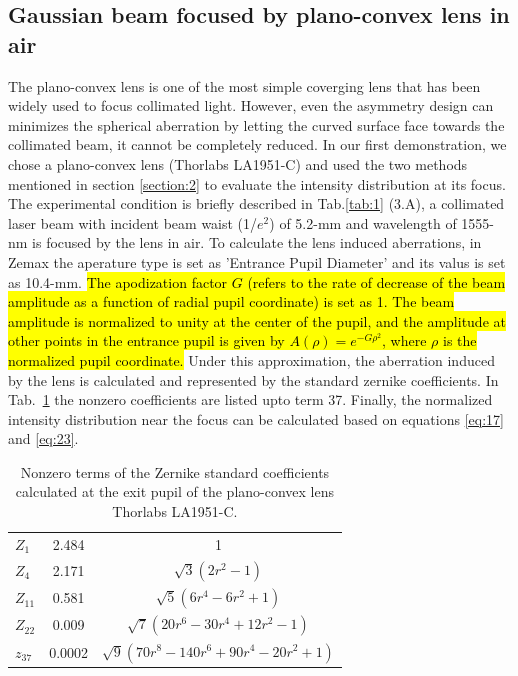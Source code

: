 \documentclass[9pt,twocolumn,twoside]{osajnl}
\begin{document}
\subsection{Gaussian beam focused by plano-convex lens in air}
The plano-convex lens is one of the most simple coverging lens that has been widely used to focus collimated light. However, even the asymmetry design can minimizes the spherical aberration by letting the curved surface face towards the collimated beam, it cannot be completely reduced. In our first demonstration, we chose a plano-convex lens (Thorlabs LA1951-C) and used the two methods mentioned in section \ref{section:2} to evaluate the intensity distribution at its focus. The experimental condition is briefly described in Tab.\ref{tab:1} (3.A), a collimated laser beam with incident beam waist (1/$e^2$) of 5.2-mm and wavelength of 1555-nm is focused by the lens in air. To calculate the lens induced aberrations, in Zemax the aperature type is set as 'Entrance Pupil Diameter' and its valus is set as 10.4-mm. \hl{The apodization factor $G$ (refers to the rate of decrease of the beam amplitude as a function of radial pupil coordinate) is set as 1. The beam amplitude is normalized to unity at the center of the pupil, and the amplitude at other points in the entrance pupil is given by $A(\rho)=e^{-G\rho^2}$, where $\rho$ is the normalized pupil coordinate.} Under this approximation, the aberration induced by the lens is calculated and represented by the standard zernike coefficients. In Tab.~\ref{tab:2} the nonzero coefficients are listed upto term 37. Finally, the normalized intensity distribution near the focus can be calculated based on equations \eqref{eq:17} and \eqref{eq:23}. 
\begin{table}
	\centering
	\begin{tabular}[c]{|l|c|c|}
		\hline
		\rowcolor{lightgray}
		$Z_1$ & 2.484 & 1 \\
		$Z_4$ & 2.171 & $\sqrt{3}(2r^2-1)$ \\
		\rowcolor{lightgray}
		$Z_{11}$ & 0.581 & $\sqrt{5}(6r^4-6r^2+1)$ \\
		$Z_{22}$ & 0.009 & $\sqrt{7}(20r^6-30r^4+12r^2-1)$\\
		\rowcolor{lightgray}
		$z_{37}$ & 0.0002 & $\sqrt{9}(70r^8-140r^6+90r^4-20r^2+1)$\\
		\hline
	\end{tabular}	
	\caption{Nonzero terms of the Zernike standard coefficients calculated at the exit pupil of the plano-convex lens Thorlabs LA1951-C.}\label{tab:2}
\end{table}
\end{document}
